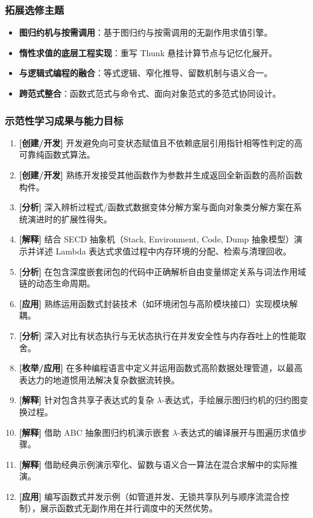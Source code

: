 \subsubsection{拓展选修主题}
\begin{itemize}
    \item \textbf{图归约机与按需调用}：基于图归约与按需调用的无副作用求值引擎。
    \item \textbf{惰性求值的底层工程实现}：重写 Thunk 悬挂计算节点与记忆化展开。
    \item \textbf{与逻辑式编程的融合}：等式逻辑、窄化推导、留数机制与语义合一。
    \item \textbf{跨范式整合}：函数式范式与命令式、面向对象范式的多范式协同设计。
\end{itemize}

\subsubsection{示范性学习成果与能力目标}
\begin{enumerate}
    \item \textbf{[创建/开发]} 开发避免向可变状态赋值且不依赖底层引用指针相等性判定的高可靠纯函数式算法。
    \item \textbf{[创建/开发]} 熟练开发接受其他函数作为参数并生成返回全新函数的高阶函数构件。
    \item \textbf{[分析]} 深入辨析过程式/函数式数据变体分解方案与面向对象类分解方案在系统演进时的扩展性得失。
    \item \textbf{[解释]} 结合 SECD 抽象机（Stack, Environment, Code, Dump 抽象模型）演示并详述 Lambda 表达式求值过程中内存环境的分配、检索与清理回收。
    \item \textbf{[分析]} 在包含深度嵌套闭包的代码中正确解析自由变量绑定关系与词法作用域链的动态生命周期。
    \item \textbf{[应用]} 熟练运用函数式封装技术（如环境闭包与高阶模块接口）实现模块解耦。
    \item \textbf{[分析]} 深入对比有状态执行与无状态执行在并发安全性与内存吞吐上的性能取舍。
    \item \textbf{[枚举/应用]} 在多种编程语言中定义并运用函数式高阶数据处理管道，以最高表达力的地道惯用法解决复杂数据流转换。
    \item \textbf{[解释]} 针对包含共享子表达式的复杂 $\lambda$-表达式，手绘展示图归约机的归约图变换过程。
    \item \textbf{[解释]} 借助 ABC 抽象图归约机演示嵌套 $\lambda$-表达式的编译展开与图遍历求值步骤。
    \item \textbf{[解释]} 借助经典示例演示窄化、留数与语义合一算法在混合求解中的实际推演。
    \item \textbf{[应用]} 编写函数式并发示例（如管道并发、无锁共享队列与顺序流混合控制），展示函数式无副作用在并行调度中的天然优势。
\end{enumerate}

